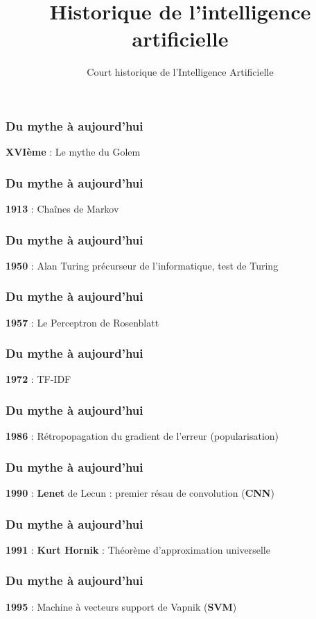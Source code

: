 \documentclass{formation}
\title{Historique de l'intelligence artificielle}
\subtitle{Court historique de l'Intelligence Artificielle}
\begin{document}
\maketitle

\begin{frame}
  \frametitle{Du mythe à aujourd'hui}
  \textbf{XVIème} : Le mythe du Golem
\end{frame}

\begin{frame}
  \frametitle{Du mythe à aujourd'hui}
  \textbf{1913} : Chaînes de Markov
\end{frame}

\begin{frame}
  \frametitle{Du mythe à aujourd'hui}
  \textbf{1950} : Alan Turing
  précurseur de l'informatique, test de Turing
\end{frame}

\begin{frame}
  \frametitle{Du mythe à aujourd'hui}
  \textbf{1957} : Le Perceptron de Rosenblatt
\end{frame}

\begin{frame}
  \frametitle{Du mythe à aujourd'hui}
  \textbf{1972} :  TF-IDF
\end{frame}

\begin{frame}
  \frametitle{Du mythe à aujourd'hui}
  \textbf{1986} : Rétropopagation du gradient de l'erreur (popularisation)
\end{frame}

\begin{frame}
  \frametitle{Du mythe à aujourd'hui}
  \textbf{1990} : \textbf{Lenet} de Lecun : premier résau de convolution (\textbf{CNN})
\end{frame}

\begin{frame}
  \frametitle{Du mythe à aujourd'hui}
  \textbf{1991} : \textbf{Kurt Hornik} : Théorème d'approximation universelle
\end{frame}

\begin{frame}
  \frametitle{Du mythe à aujourd'hui}
  \textbf{1995} : Machine à vecteurs support de Vapnik (\textbf{SVM})
\end{frame}
\end{document}
